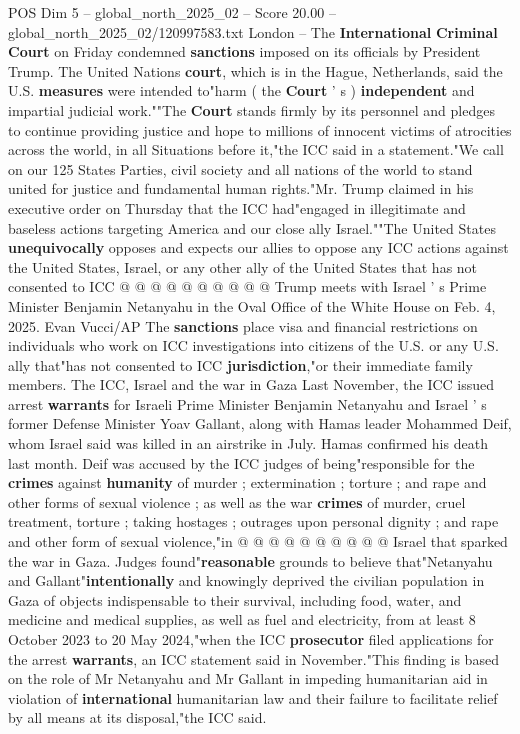 \begin{textsample}{POS Dim 5 – global\_north\_2025\_02 – Score 20.00 – global\_north\_2025\_02/120997583.txt}  \label{ex:f5_pos_203}
London -- The \textbf{International} \textbf{Criminal} \textbf{Court} on Friday condemned \textbf{sanctions} imposed on its officials by President Trump.
The United Nations \textbf{court}, which is in the Hague, Netherlands, said the U.S. \textbf{measures} were intended to"harm ( the \textbf{Court} ' s ) \textbf{independent} and impartial judicial work.""The \textbf{Court} stands firmly by its personnel and pledges to continue providing justice and hope to millions of innocent victims of atrocities across the world, in all Situations before it,"the ICC said in a statement."We call on our 125 States Parties, civil society and all nations of the world to stand united for justice and fundamental human rights."Mr.
Trump claimed in his executive order on Thursday that the ICC had"engaged in illegitimate and baseless actions targeting America and our close ally Israel.""The United States \textbf{unequivocally} opposes and expects our allies to oppose any ICC actions against the United States, Israel, or any other ally of the United States that has not consented to ICC @ @ @ @ @ @ @ @ @ @ Trump meets with Israel ' s Prime Minister Benjamin Netanyahu in the Oval Office of the White House on Feb. 4, 2025.
Evan Vucci/AP The \textbf{sanctions} place visa and financial restrictions on individuals who work on ICC investigations into citizens of the U.S. or any U.S. ally that"has not consented to ICC \textbf{jurisdiction},"or their immediate family members.
The ICC, Israel and the war in Gaza Last November, the ICC issued arrest \textbf{warrants} for Israeli Prime Minister Benjamin Netanyahu and Israel ' s former Defense Minister Yoav Gallant, along with Hamas leader Mohammed Deif, whom Israel said was killed in an airstrike in July.
Hamas confirmed his death last month.
Deif was accused by the ICC judges of being"responsible for the \textbf{crimes} against \textbf{humanity} of murder ; extermination ; torture ; and rape and other forms of sexual violence ; as well as the war \textbf{crimes} of murder, cruel treatment, torture ; taking hostages ; outrages upon personal dignity ; and rape and other form of sexual violence,"in @ @ @ @ @ @ @ @ @ @ Israel that sparked the war in Gaza.
Judges found"\textbf{reasonable} grounds to believe that"Netanyahu and Gallant"\textbf{intentionally} and knowingly deprived the civilian population in Gaza of objects indispensable to their survival, including food, water, and medicine and medical supplies, as well as fuel and electricity, from at least 8 October 2023 to 20 May 2024,"when the ICC \textbf{prosecutor} filed applications for the arrest \textbf{warrants}, an ICC statement said in November."This finding is based on the role of Mr Netanyahu and Mr Gallant in impeding humanitarian aid in violation of \textbf{international} humanitarian law and their failure to facilitate relief by all means at its disposal,"the ICC said.

\end{textsample}
